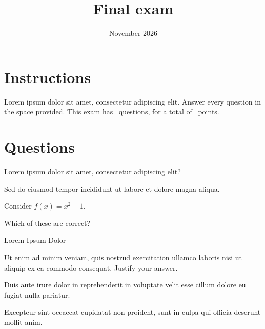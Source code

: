 \documentclass[exam,addpoints]{dtakdoc}
\title{Final exam}
\date{November 2026}
\begin{document}
\maketitle

\section*{Instructions}
Lorem ipsum dolor sit amet, consectetur adipiscing elit. Answer every question in the space provided.
This exam has \numquestions\ questions, for a total of \numpoints\ points.

\begin{center}
  \gradetable[h][questions]
\end{center}

\section*{Questions}
\begin{questions}

\question[2] Lorem ipsum dolor sit amet, consectetur adipiscing elit?
\begin{solution}
  Sed do eiusmod tempor incididunt ut labore et dolore magna aliqua.
\end{solution}
\vspace{40mm}

\question Consider $f(x) = x^2 + 1$.

\question[3] Which of these are correct?
\begin{checkboxes}
  \choice Lorem
  \CorrectChoice Ipsum
  \choice Dolor
\end{checkboxes}

\question[5] Ut enim ad minim veniam, quis nostrud exercitation ullamco laboris nisi ut aliquip ex ea commodo
consequat. Justify your answer.
\begin{solution}[50mm]
  Duis aute irure dolor in reprehenderit in voluptate velit esse cillum dolore eu fugiat nulla pariatur.
\end{solution}

\question[5] Excepteur sint occaecat cupidatat non proident, sunt in culpa qui officia deserunt mollit anim.
\vspace{80mm}

\end{questions}
\end{document}
